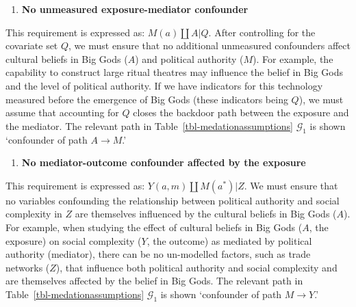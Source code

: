\documentclass[
  single column]{article}
\providecommand{\tightlist}{%
  \setlength{\itemsep}{0pt}\setlength{\parskip}{0pt}}\usepackage{longtable,booktabs,array}
\begin{document}
\begin{enumerate}
\def\labelenumi{\arabic{enumi}.}
\setcounter{enumi}{2}
\tightlist
\item
  \textbf{No unmeasured exposure-mediator confounder}
\end{enumerate}

This requirement is expressed as: \(M(a) \coprod A | Q\). After
controlling for the covariate set \(Q\), we must ensure that no
additional unmeasured confounders affect cultural beliefs in Big Gods
(\(A\)) and political authority (\(M\)). For example, the capability to
construct large ritual theatres may influence the belief in Big Gods and
the level of political authority. If we have indicators for this
technology measured before the emergence of Big Gods (these indicators
being \(Q\)), we must assume that accounting for \(Q\) closes the
backdoor path between the exposure and the mediator. The relevant path
in Table~\ref{tbl-medationassumptions} \(\mathcal{G}_1\) is shown
`confounder of path \(A \to M\).'

\begin{enumerate}
\def\labelenumi{\arabic{enumi}.}
\setcounter{enumi}{3}
\tightlist
\item
  \textbf{No mediator-outcome confounder affected by the exposure}
\end{enumerate}

This requirement is expressed as: \(Y(a,m) \coprod M(a^*) | Z\). We must
ensure that no variables confounding the relationship between political
authority and social complexity in \(Z\) are themselves influenced by
the cultural beliefs in Big Gods (\(A\)). For example, when studying the
effect of cultural beliefs in Big Gods (\(A\), the exposure) on social
complexity (\(Y\), the outcome) as mediated by political authority
(mediator), there can be no un-modelled factors, such as trade networks
(\(Z\)), that influence both political authority and social complexity
and are themselves affected by the belief in Big Gods. The relevant path
in Table~\ref{tbl-medationassumptions} \(\mathcal{G}_1\) is shown
`confounder of path \(M \to Y\).'
\end{document}
